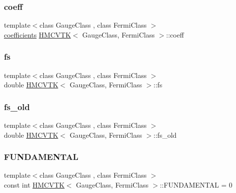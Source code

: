 \mbox{\label{class_h_m_c_v_t_k_a6b8e384e877ba74f193b28c6799ca837}} 
\subsubsection{\texorpdfstring{coeff}{coeff}}
{\footnotesize\ttfamily template$<$class Gauge\+Class , class Fermi\+Class $>$ \\
\hyperlink{classcoefficients}{coefficients} \hyperlink{class_h_m_c_v_t_k}{H\+M\+C\+V\+TK}$<$ Gauge\+Class, Fermi\+Class $>$\+::coeff}

\mbox{\label{class_h_m_c_v_t_k_a5c0664c21a199655f601be5f7a777612}} 
\subsubsection{\texorpdfstring{fs}{fs}}
{\footnotesize\ttfamily template$<$class Gauge\+Class , class Fermi\+Class $>$ \\
double \hyperlink{class_h_m_c_v_t_k}{H\+M\+C\+V\+TK}$<$ Gauge\+Class, Fermi\+Class $>$\+::fs}

\mbox{\label{class_h_m_c_v_t_k_ae9cfa8c2ba17452e2002c1e127ad6844}} 
\subsubsection{\texorpdfstring{fs\+\_\+old}{fs\_old}}
{\footnotesize\ttfamily template$<$class Gauge\+Class , class Fermi\+Class $>$ \\
double \hyperlink{class_h_m_c_v_t_k}{H\+M\+C\+V\+TK}$<$ Gauge\+Class, Fermi\+Class $>$\+::fs\+\_\+old}

\mbox{\label{class_h_m_c_v_t_k_affeaaf576332c14490744646825d1834}} 
\subsubsection{\texorpdfstring{F\+U\+N\+D\+A\+M\+E\+N\+T\+AL}{FUNDAMENTAL}}
{\footnotesize\ttfamily template$<$class Gauge\+Class , class Fermi\+Class $>$ \\
const int \hyperlink{class_h_m_c_v_t_k}{H\+M\+C\+V\+TK}$<$ Gauge\+Class, Fermi\+Class $>$\+::F\+U\+N\+D\+A\+M\+E\+N\+T\+AL = 0\hspace{0.3cm}{\ttfamily [static]}}

